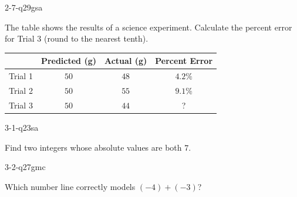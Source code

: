 \begin{practiceQuestion}{2-7-q29}{gsa}
\begin{questionText}
The table shows the results of a science experiment. Calculate the percent error for Trial 3 (round to the nearest tenth).

\begin{center}
\begin{tabular}{|l|c|c|c|}
\hline
 & \textbf{Predicted (g)} & \textbf{Actual (g)} & \textbf{Percent Error} \\
\hline
Trial 1 & $50$ & $48$ & $4.2\%$ \\
\hline
Trial 2 & $50$ & $55$ & $9.1\%$ \\
\hline
Trial 3 & $50$ & $44$ & ? \\
\hline
\end{tabular}
\end{center}
\end{questionText}
\end{practiceQuestion}

\begin{practiceQuestion}{3-1-q23}{sa}
\begin{questionText}
Find two integers whose absolute values are both $7$.
\end{questionText}
\end{practiceQuestion}

\begin{practiceQuestion}{3-2-q27}{gmc}
\begin{questionText}
Which number line correctly models $(-4) + (-3)$?

\begin{center}
\end{center}
\end{questionText}
\end{practiceQuestion}

